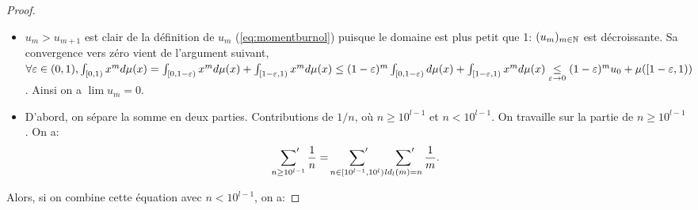 \begin{proof}
	\ \\
	\begin{itemize}
		\item[\textbullet] $u_{m} > u_{m+1}$ est clair de la définition de $u_{m}$
			(\ref{eq:momentburnol}) puisque le domaine est plus petit que 1:
			$(u_{m})_{m\in\mathbb{N}}$ est décroissante. Sa convergence vers zéro vient
			de l'argument suivant, $\forall \varepsilon \in (0,1), \int_{[0, 1)} x^{m}
			d\mu(x) = \int_{[0, 1-\varepsilon)} x^{m} d\mu(x) + \int_{[1-\varepsilon, 1)}
			x^{m} d\mu(x) \le (1-\varepsilon)^{m} \int_{[0, 1-\varepsilon)} d\mu(x)
			+ \int_{[1-\varepsilon, 1)} x^{m} d\mu(x) \underset{\varepsilon \rightarrow
			0}{\le} (1-\varepsilon)^{m} u_{0} + \mu([1-\varepsilon, 1))$. Ainsi on
			a $\lim u_{m} = 0$.\\

		\item[\textbullet] D'abord, on s\'epare la somme en deux parties.
			Contributions de $1/n$, o\`u $n \ge 10^{l-1}$ et $n < 10^{l-1}$. On
			travaille sur la partie de $n\ge 10^{l-1}$. On a:
			\[
				\sideset{}{'}\sum_{n\ge 10^{l-1}} \frac{1}{n} = \sideset{}{'}\sum_{n\in [10^{l-1},
				10^{l})} \sideset{}{'}\sum_{ld_{l}(m)=n}\frac{1}{m}.
			\]
	\end{itemize}
	Alors, si on combine cette équation avec $n < 10^{l-1}$, on a:


\end{proof}
